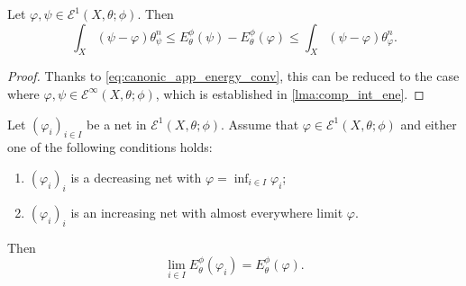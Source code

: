 \begin{proposition}\label{prop:Ediffbdd}
Let $\varphi,\psi\in \mathcal{E}^1(X,\theta;\phi)$. Then
    \begin{equation}
        \int_X \left(\psi-\varphi\right)\theta^n_{\psi}\leq E_{\theta}^{\phi}(\psi)-E_{\theta}^{\phi}(\varphi)\leq \int_X \left(\psi-\varphi\right)\theta^n_{\varphi}.
    \end{equation}
\end{proposition}
\begin{proof}
    Thanks to \eqref{eq:canonic_app_energy_conv}, this can be reduced to the case where $\varphi,\psi\in \mathcal{E}^{\infty}(X,\theta;\phi)$, which is established in \cref{lma:comp_int_ene}.
\end{proof}


\begin{proposition}\label{prop:Econt_mono}
    Let $(\varphi_i)_{i\in I}$ be a net in $\mathcal{E}^1(X,\theta;\phi)$. Assume that $\varphi\in \mathcal{E}^1(X,\theta;\phi)$ and either one of the following conditions holds:
    \begin{enumerate}
        \item\label{itm:prop:Econt_mono:1} $(\varphi_i)_i$ is a decreasing net with $\varphi=\inf_{i\in I}\varphi_i$;
        \item\label{itm:prop:Econt_mono:2} $(\varphi_i)_i$ is an increasing net with almost everywhere limit $\varphi$.
    \end{enumerate}
    Then
    \begin{equation}\label{eq:Iconv_mono}
    \lim_{i\in I} E_{\theta}^{\phi}(\varphi_i)=E_{\theta}^{\phi}(\varphi).
    \end{equation}
\end{proposition}
